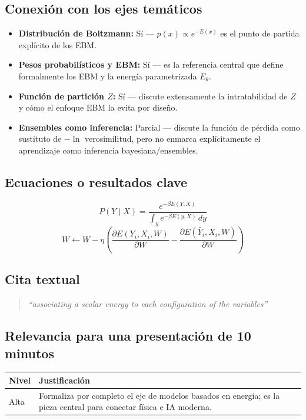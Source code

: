 \documentclass[12pt]{article}
\begin{document}
\subsection*{Conexión con los ejes temáticos}
\begin{itemize}
  \item \textbf{Distribución de Boltzmann:} Sí --- $p(x) \propto e^{-E(x)}$ es el punto de partida explícito de los EBM.
  \item \textbf{Pesos probabilísticos y EBM:} Sí --- es la referencia central que define formalmente los EBM y la energía parametrizada $E_\theta$.
  \item \textbf{Función de partición $Z$:} Sí --- discute extensamente la intratabilidad de $Z$ y cómo el enfoque EBM la evita por diseño.
  \item \textbf{Ensembles como inferencia:} Parcial --- discute la función de pérdida como sustituto de $-\ln$ verosimilitud, pero no enmarca explícitamente el aprendizaje como inferencia bayesiana/ensembles.
\end{itemize}

\subsection*{Ecuaciones o resultados clave}
\begin{equation}
P(Y\mid X) = \frac{e^{-\beta E(Y,X)}}{\int_{y} e^{-\beta E(y,X)}\,dy}
\end{equation}
\begin{equation}
W \leftarrow W - \eta\left(\frac{\partial E(Y_i,X_i,W)}{\partial W} - \frac{\partial E(\bar Y_i,X_i,W)}{\partial W}\right)
\end{equation}

\subsection*{Cita textual}
\begin{quote}
\textit{``associating a scalar energy to each configuration of the variables''}
\end{quote}

\subsection*{Relevancia para una presentación de 10 minutos}
\begin{tabular}{@{}p{2cm}p{11.5cm}@{}}
\toprule
\textbf{Nivel} & \textbf{Justificación} \\
\midrule
Alta & Formaliza por completo el eje de modelos basados en energía; es la pieza central para conectar física e IA moderna. \\
\bottomrule
\end{tabular}
\end{document}
